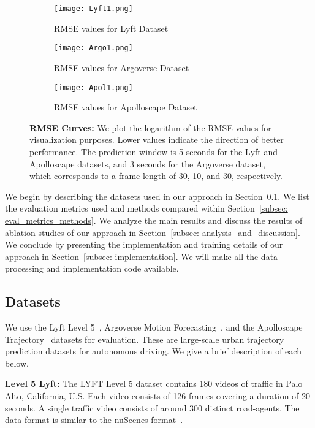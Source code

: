 \documentclass[10pt,twocolumn,letterpaper]{article}
\theoremstyle{plain}
\begin{document}
\begin{figure*}
  \begin{subfigure}[h]{0.34\textwidth}
    \texttt{[image: Lyft1.png]}
    \caption{RMSE values for Lyft Dataset}
    \label{fig: rmse_lyft}
  \end{subfigure}
\begin{subfigure}[h]{0.34\textwidth}
    \texttt{[image: Argo1.png]}
    \caption{RMSE values for Argoverse Dataset}
    \label{fig: rmse_argo}
  \end{subfigure}
\begin{subfigure}[h]{0.34\textwidth}
    \texttt{[image: Apol1.png]}
    \caption{RMSE values for Apolloscape Dataset}
    \label{fig: rmse_apol}
  \end{subfigure}
  \caption{\textbf{RMSE Curves:} We plot the logarithm of the RMSE values for visualization purposes. Lower values indicate the direction of better performance. The prediction window is 5 seconds for the Lyft and Apolloscape datasets, and 3 seconds for the Argoverse dataset, which corresponds to a frame length of 30, 10, and 30, respectively.}
  \label{fig: rmse}
  \vspace{-5pt}
\end{figure*}


We begin by describing the datasets used in our approach in Section~\ref{subsec: datasets}. We list the evaluation metrics used and methods compared within Section~\ref{subsec: eval_metrics_methods}. We analyze the main results and discuss the results of ablation studies of our approach in Section~\ref{subsec: analysis_and_discussion}. We conclude by presenting the implementation and training details of our approach in Section~\ref{subsec: implementation}. We will make all the data processing and implementation code available.


\subsection{Datasets}
\label{subsec: datasets}

We use the Lyft Level 5~\cite{lyft2019}, Argoverse Motion Forecasting~\cite{Argoverse}, and the Apolloscape Trajectory~\cite{ma2018trafficpredict} datasets for evaluation. These are large-scale urban trajectory prediction datasets for autonomous driving. We give a brief description of each below.

\noindent \textbf{Level 5 Lyft: } The LYFT Level 5 dataset contains 180 videos of traffic in Palo Alto, California, U.S. Each video consists of 126 frames covering a duration of 20 seconds. A single traffic video consists of around 300 distinct road-agents. The data format is similar to the nuScenes format~\cite{nuscenes2019}.
\end{document}
